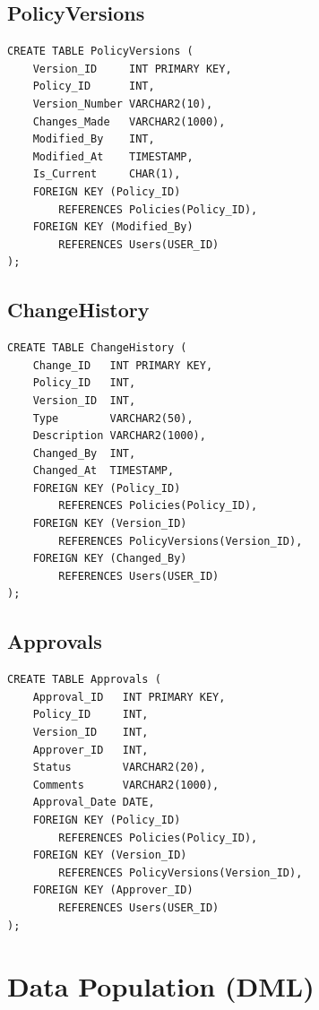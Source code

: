 \documentclass[conference]{IEEEtran}
\begin{document}
\subsection{PolicyVersions}
\begin{lstlisting}[style=sqlstyle, caption={DDL: PolicyVersions table}]
CREATE TABLE PolicyVersions (
    Version_ID     INT PRIMARY KEY,
    Policy_ID      INT,
    Version_Number VARCHAR2(10),
    Changes_Made   VARCHAR2(1000),
    Modified_By    INT,
    Modified_At    TIMESTAMP,
    Is_Current     CHAR(1),
    FOREIGN KEY (Policy_ID)
        REFERENCES Policies(Policy_ID),
    FOREIGN KEY (Modified_By)
        REFERENCES Users(USER_ID)
);
\end{lstlisting}

\subsection{ChangeHistory}
\begin{lstlisting}[style=sqlstyle, caption={DDL: ChangeHistory table}]
CREATE TABLE ChangeHistory (
    Change_ID   INT PRIMARY KEY,
    Policy_ID   INT,
    Version_ID  INT,
    Type        VARCHAR2(50),
    Description VARCHAR2(1000),
    Changed_By  INT,
    Changed_At  TIMESTAMP,
    FOREIGN KEY (Policy_ID)
        REFERENCES Policies(Policy_ID),
    FOREIGN KEY (Version_ID)
        REFERENCES PolicyVersions(Version_ID),
    FOREIGN KEY (Changed_By)
        REFERENCES Users(USER_ID)
);
\end{lstlisting}

\subsection{Approvals}
\begin{lstlisting}[style=sqlstyle, caption={DDL: Approvals table}]
CREATE TABLE Approvals (
    Approval_ID   INT PRIMARY KEY,
    Policy_ID     INT,
    Version_ID    INT,
    Approver_ID   INT,
    Status        VARCHAR2(20),
    Comments      VARCHAR2(1000),
    Approval_Date DATE,
    FOREIGN KEY (Policy_ID)
        REFERENCES Policies(Policy_ID),
    FOREIGN KEY (Version_ID)
        REFERENCES PolicyVersions(Version_ID),
    FOREIGN KEY (Approver_ID)
        REFERENCES Users(USER_ID)
);
\end{lstlisting}

\section{Data Population (DML)}
\end{document}
